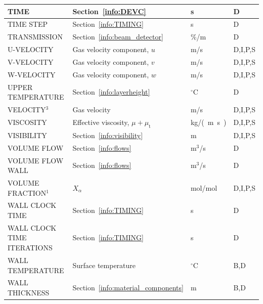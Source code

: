 \documentclass[11pt]{book}
\begin{document}
\begin{longtable}{@{\extracolsep{\fill}}|l|l|l|l|}
{\ct TIME}                                      & Section~\ref{info:DEVC}                       & s              & D            \\ \hline
{\ct TIME STEP}                                 & Section~\ref{info:TIMING}                     & s              & D            \\ \hline
{\ct TRANSMISSION}                              & Section~\ref{info:beam_detector}              & \%/m           & D            \\ \hline
{\ct U-VELOCITY}                                & Gas velocity component, $u$                   & m/s            & D,I,P,S      \\ \hline
{\ct V-VELOCITY}                                & Gas velocity component, $v$                   & m/s            & D,I,P,S      \\ \hline
{\ct W-VELOCITY}                                & Gas velocity component, $w$                   & m/s            & D,I,P,S      \\ \hline
{\ct UPPER TEMPERATURE}                         & Section~\ref{info:layerheight}                & $^\circ$C      & D            \\ \hline
{\ct VELOCITY}$^3$                              & Gas velocity                                  & m/s            & D,I,P,S      \\ \hline
{\ct VISCOSITY}                                 & Effective viscosity, $\mu + \mu_{\mathrm{t}}$ & \si{kg/(m.s)}  & D,I,P,S      \\ \hline
{\ct VISIBILITY}                                & Section~\ref{info:visibility}                 & m              & D,I,P,S      \\ \hline
{\ct VOLUME FLOW}                               & Section~\ref{info:flows}                      & m$^3$/s        & D            \\ \hline
{\ct VOLUME FLOW WALL}                          & Section~\ref{info:flows}                      & m$^3$/s        & D            \\ \hline
{\ct VOLUME FRACTION}$^1$                       & $X_\alpha$                                    & mol/mol        & D,I,P,S      \\ \hline
{\ct WALL CLOCK TIME}                           & Section~\ref{info:TIMING}                     & s              & D            \\ \hline
{\ct WALL CLOCK TIME ITERATIONS}                & Section~\ref{info:TIMING}                     & s              & D            \\ \hline
{\ct WALL TEMPERATURE}                          & Surface temperature                           & $^\circ$C      & B,D          \\ \hline
{\ct WALL THICKNESS}                            & Section~\ref{info:material_components}        & m              & B,D          \\ \hline
\end{longtable}
\end{document}
